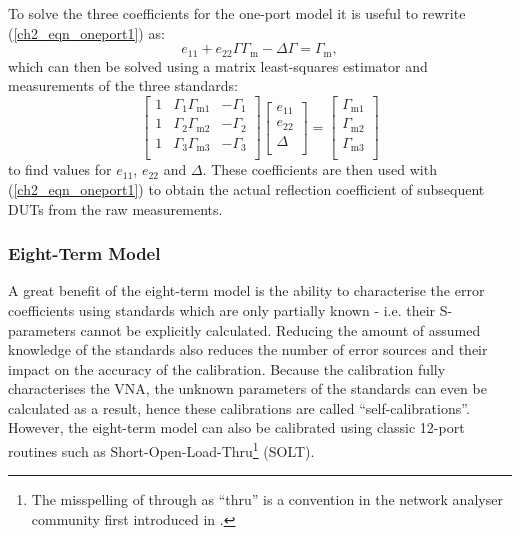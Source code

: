 \documentclass[../thesis/thesis.tex]{subfiles}
\begin{document}
\begin{refsection}
To solve the three coefficients for the one-port model it is useful to rewrite (\ref{ch2_eqn_oneport1}) as: 
\begin{equation}
	e_{11}+e_{22}\Gamma\Gamma_{\textrm{m}}-\Delta\Gamma = \Gamma_{\textrm{m}},
\end{equation}
which can then be solved using a matrix least-squares estimator and measurements of the three standards:
\begin{equation}
	\begin{bmatrix}
		1 & \Gamma_1\Gamma_{\textrm{m}1} & -\Gamma_1 \\
		1 & \Gamma_2\Gamma_{\textrm{m}2} & -\Gamma_2 \\
		1 & \Gamma_3\Gamma_{\textrm{m}3} & -\Gamma_3 \\
	\end{bmatrix}
	\begin{bmatrix}
		e_{11} \\
		e_{22} \\
		\Delta \\
	\end{bmatrix}
	=
	\begin{bmatrix}
		\Gamma_{\textrm{m}1} \\
		\Gamma_{\textrm{m}2} \\
		\Gamma_{\textrm{m}3} \\
	\end{bmatrix}
\end{equation}
to find values for $e_{11}$, $e_{22}$ and $\Delta$. These coefficients are then used with (\ref{ch2_eqn_oneport1}) to obtain the actual reflection coefficient of subsequent DUTs from the raw measurements.

\subsubsection{Eight-Term Model}

A great benefit of the eight-term model is the ability to characterise the error coefficients using standards which are only partially known - i.e. their S-parameters cannot be explicitly calculated. Reducing the amount of assumed knowledge of the standards also reduces the number of error sources and their impact on the accuracy of the calibration. Because the calibration fully characterises the VNA, the unknown parameters of the standards can even be calculated as a result, hence these calibrations are called ``self-calibrations''. However, the eight-term model can also be calibrated using classic 12-port routines such as Short-Open-Load-Thru\footnote{The misspelling of through as ``thru'' is a convention in the network analyser community first introduced in \cite{Engen_1979}.} (SOLT).


\end{refsection}
\end{document}
